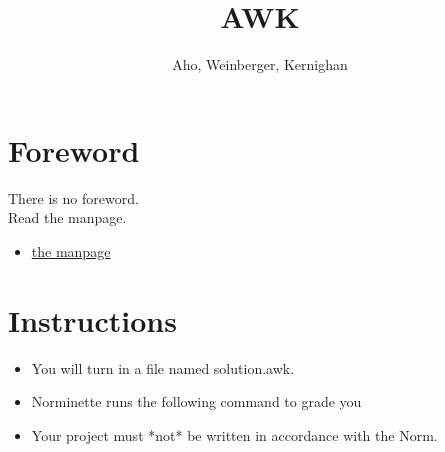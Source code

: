 \documentclass{42-en}
\begin{document}
\title{AWK}
\subtitle{Aho, Weinberger, Kernighan}

    \maketitle

    \tableofcontents

\newpage
\chapter{Foreword}

    There is no foreword.\\
    Read the manpage.\\

    \begin{itemize}\itemsep7pt

        \item \href{https://man.openbsd.org/awk}{the manpage}\\

    \end{itemize}

\newpage

\chapter{Instructions}

    \begin{itemize}

      \item You will turn in a file named solution.awk.
      \item Norminette runs the following command to grade you
        \begin{42console}
%
        \end{42console}

      \item Your project must *not* be written in accordance with the Norm.

    \end{itemize}
\end{document}
